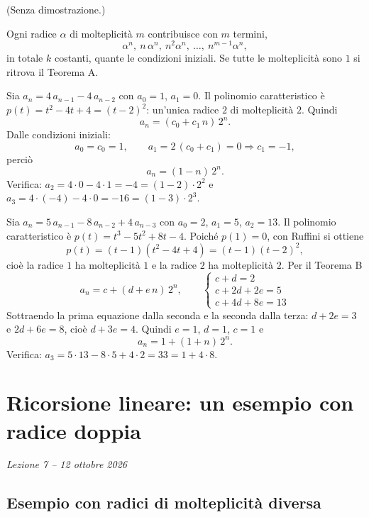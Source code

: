 \documentclass[11pt,a4paper]{article}
\begin{document}
(Senza dimostrazione.)

\begin{osservazione}
Ogni radice $\alpha$ di molteplicità $m$ contribuisce con $m$ termini,
\[
  \alpha^n,\ n\,\alpha^n,\ n^2\alpha^n,\ \dots,\ n^{m-1}\alpha^n ,
\]
in totale $k$ costanti, quante le condizioni iniziali. Se tutte le molteplicità
sono $1$ si ritrova il Teorema A.
\end{osservazione}

\begin{esempio}
Sia $a_n = 4\, a_{n-1} - 4\, a_{n-2}$ con $a_0 = 1$, $a_1 = 0$. Il polinomio
caratteristico è $p(t) = t^2 - 4t + 4 = (t - 2)^2$: un'unica radice $2$ di
molteplicità $2$. Quindi
\[
  a_n = (c_0 + c_1\, n)\, 2^n .
\]
Dalle condizioni iniziali:
\[
  a_0 = c_0 = 1 , \qquad a_1 = 2\,(c_0 + c_1) = 0 \Rightarrow c_1 = -1 ,
\]
perciò
\[
  a_n = (1 - n)\, 2^n .
\]
Verifica: $a_2 = 4 \cdot 0 - 4 \cdot 1 = -4 = (1-2)\cdot 2^2$ e
$a_3 = 4\cdot(-4) - 4 \cdot 0 = -16 = (1-3)\cdot 2^3$.
\end{esempio}

\begin{esempio}
Sia $a_n = 5\, a_{n-1} - 8\, a_{n-2} + 4\, a_{n-3}$ con $a_0 = 2$, $a_1 = 5$,
$a_2 = 13$. Il polinomio caratteristico è $p(t) = t^3 - 5t^2 + 8t - 4$.
Poiché $p(1) = 0$, con Ruffini si ottiene
\[
  p(t) = (t - 1)(t^2 - 4t + 4) = (t - 1)(t - 2)^2 ,
\]
cioè la radice $1$ ha molteplicità $1$ e la radice $2$ ha molteplicità $2$.
Per il Teorema B
\[
  a_n = c + (d + e\, n)\, 2^n ,
  \qquad
  \begin{cases}
    c + d = 2 \\
    c + 2d + 2e = 5 \\
    c + 4d + 8e = 13
  \end{cases}
\]
Sottraendo la prima equazione dalla seconda e la seconda dalla terza:
$d + 2e = 3$ e $2d + 6e = 8$, cioè $d + 3e = 4$. Quindi $e = 1$, $d = 1$,
$c = 1$ e
\[
  a_n = 1 + (1 + n)\, 2^n .
\]
Verifica: $a_3 = 5 \cdot 13 - 8 \cdot 5 + 4 \cdot 2 = 33 = 1 + 4 \cdot 8$.
\end{esempio}

\section[Ricorsione lineare: un esempio con radice doppia (Lezione 7 -- 12 ottobre 2026)]{Ricorsione lineare: un esempio con radice doppia}
\noindent\emph{Lezione 7 -- 12 ottobre 2026}
\subsection{Esempio con radici di molteplicità diversa}
\end{document}
